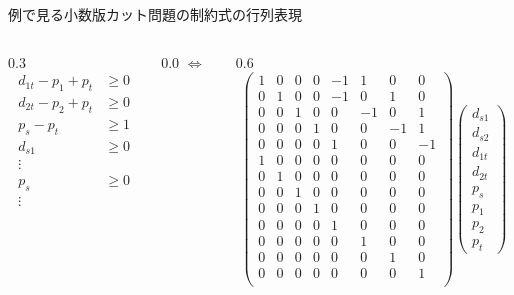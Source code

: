 \documentclass[aspectratio=169]{beamer}
\begin{document}
\begin{frame}{例で見る小数版カット問題の制約式の行列表現}
\begin{example}[小数版カット問題の制約式]
{\begin{columns}
\begin{column}{0.3\textwidth}
{\begin{align*}
							d_{1t} - p_1 + p_t & \geq 0 \\
							d_{2t} - p_2 + p_t & \geq 0 \\
							p_s - p_t          & \geq 1 \\
							d_{s1}             & \geq 0 \\
							\vdots             &        \\
							p_s                & \geq 0 \\
							\vdots             &        \\
						\end{align*}
					}
				\end{column}
				\begin{column}{0.0\textwidth}
					\(\Leftrightarrow\)
				\end{column}
				\begin{column}{0.6\textwidth}
					\small{
						\[
							\begin{pmatrix}
								1 & 0 & 0 & 0 & -1 & 1  & 0  & 0  \\
								0 & 1 & 0 & 0 & -1 & 0  & 1  & 0  \\
								0 & 0 & 1 & 0 & 0  & -1 & 0  & 1  \\
								0 & 0 & 0 & 1 & 0  & 0  & -1 & 1  \\
								0 & 0 & 0 & 0 & 1  & 0  & 0  & -1 \\
								\hline
								1 & 0 & 0 & 0 & 0  & 0  & 0  & 0  \\
								0 & 1 & 0 & 0 & 0  & 0  & 0  & 0  \\
								0 & 0 & 1 & 0 & 0  & 0  & 0  & 0  \\
								0 & 0 & 0 & 1 & 0  & 0  & 0  & 0  \\
								0 & 0 & 0 & 0 & 1  & 0  & 0  & 0  \\
								0 & 0 & 0 & 0 & 0  & 1  & 0  & 0  \\
								0 & 0 & 0 & 0 & 0  & 0  & 1  & 0  \\
								0 & 0 & 0 & 0 & 0  & 0  & 0  & 1  \\
							\end{pmatrix}
							\begin{pmatrix}
								d_{s1} \\ d_{s2} \\ d_{1t} \\ d_{2t} \\ p_s \\ p_1 \\ p_2 \\ p_t
							\end{pmatrix}
\]}
\end{column}
\end{columns}}
\end{example}
\end{frame}
\end{document}
